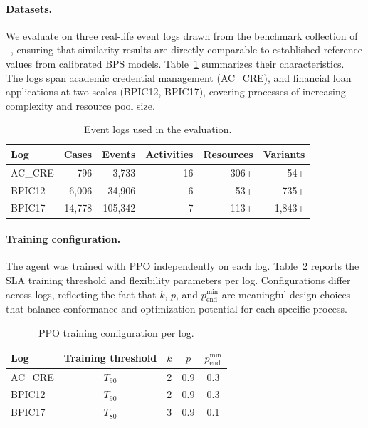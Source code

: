 \documentclass[runningheads]{llncs}
\begin{document}
\paragraph{Datasets.}
We evaluate on three real-life event logs drawn from the benchmark 
collection of 
\citeauthor{framework_for_measuring_the_quality_of_business_process_simulation_models}~\cite{framework_for_measuring_the_quality_of_business_process_simulation_models},
ensuring that similarity results are directly comparable to established 
reference values from calibrated BPS models. Table~\ref{tab:datasets} 
summarizes their characteristics. The logs span academic credential 
management (AC\_CRE), and financial loan applications at two scales 
(BPIC12, BPIC17), covering processes of increasing complexity and 
resource pool size.
%
\begin{table}[!ht]
\centering
\small
\renewcommand{\arraystretch}{1.1}
\begin{tabular}{lrrrrr}
\hline
\textbf{Log} & \textbf{Cases} & \textbf{Events} &
\textbf{Activities} & \textbf{Resources} & \textbf{Variants} \\
\hline
AC\_CRE  & 796       & 3{,}733    & 16 & 306+  & 54+      \\
BPIC12   & 6{,}006   & 34{,}906   & 6  & 53+   & 735+     \\
BPIC17   & 14{,}778  & 105{,}342  & 7  & 113+  & 1{,}843+ \\
\hline
\end{tabular}
\caption{Event logs used in the evaluation.}
\label{tab:datasets}
\end{table}

\paragraph{Training configuration.}
The agent was trained with PPO independently on each log. 
Table~\ref{tab:training} reports the SLA training threshold and 
flexibility parameters per log. Configurations differ across logs, 
reflecting the fact that $k$, $p$, and $p_{\mathrm{end}}^{\min}$ 
are meaningful design choices that balance conformance and 
optimization potential for each specific process.
%
\begin{table}[!ht]
\centering
\small
\renewcommand{\arraystretch}{1.1}
\begin{tabular}{lcccc}
\hline
\textbf{Log} & \textbf{Training threshold} & $k$ & $p$ & 
$p_{\mathrm{end}}^{\min}$ \\
\hline
AC\_CRE & $T_{90}$ & 2 & 0.9 & 0.3 \\
BPIC12  & $T_{90}$ & 2 & 0.9 & 0.3 \\
BPIC17  & $T_{80}$ & 3 & 0.9 & 0.1 \\
\hline
\end{tabular}
\caption{PPO training configuration per log.}
\label{tab:training}
\end{table}
\end{document}
